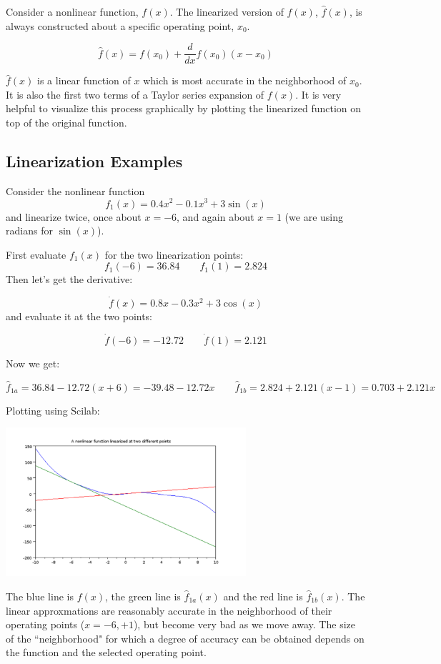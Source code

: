 Consider a nonlinear function, $f(x)$.  The linearized version of $f(x)$, $\hat{f}(x)$,  is always constructed about a specific operating point, $x_0$.

\[
\hat{f}(x) = f(x_0) + \frac{d}{dx}f(x_0) (x-x_0)
\]

$\hat{f}(x)$ is a linear function of $x$ which is most accurate in the neighborhood of $x_0$.   It is also the  first two terms of a Taylor series expansion of $f(x)$.   It is very helpful to visualize this process graphically by plotting the linearized function on top of the original function.


\subsection{Linearization Examples}
\begin{ExampleSmall}\label{twolinexamples}

Consider the nonlinear function
\[
f_1(x) = 0.4x^2 -0.1x^3 + 3\sin(x)
\]
and linearize twice, once about $x=-6$, and again about $x=1$ (we are using radians for $\sin(x)$).

\vspace{0.2in}

First evaluate $f_1(x)$ for the two linearization points:
\[
f_1(-6) = 36.84 \qquad  f_1(1) = 2.824
\]
Then let's get the derivative:

\[
\dot{f}(x) = 0.8x -0.3x^2 +3\cos(x)
\]
and evaluate it at the two points:

\[
\dot{f}(-6) = -12.72 \qquad \dot{f}(1) = 2.121
\]

Now we get:

\[
\hat{f}_{1a} = 36.84-12.72(x+6) = -39.48-12.72x \qquad \hat{f}_{1b} = 2.824+2.121(x-1) = 0.703+2.121x
\]

Plotting using Scilab:
\begin{center}
\includegraphics[width=3.5in]{figs01/linearizeattwopointsa.png}
\end{center}

The blue line is $f(x)$, the green line is $\hat{f}_{1a}(x)$ and the red line is $\hat{f}_{1b}(x)$.  The linear approxmations are reasonably accurate in the neighborhood of their operating points ($x = -6, +1$), but become very bad as we move away.  The size of the ``neighborhood" for which a degree of accuracy can be obtained depends on the function and the selected operating point.

\end{ExampleSmall}


